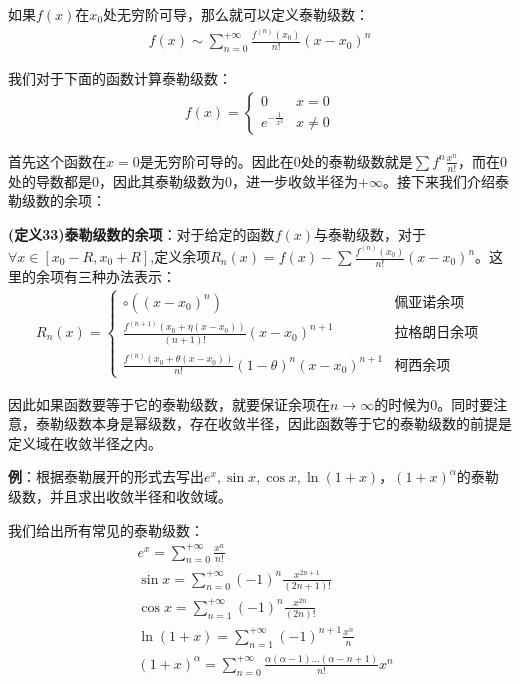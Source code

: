 \documentclass{ctexart}
\let\oldtextbf\textbf
\renewcommand{\textbf}[1]{\textcolor{brown!50!red}{\oldtextbf{#1}}}
\begin{document}
如果$f(x)$在$x_0$处无穷阶可导，那么就可以定义泰勒级数：
\begin{align*}
    f(x)\sim\sum_{n=0}^{+\infty}\frac{f^{(n)}(x_0)}{n!}(x-x_0)^n
\end{align*}

我们对于下面的函数计算泰勒级数：
\begin{align*}
    f(x)=\begin{cases}
        0&x=0\\
        e^{-\frac{1}{x^2}}& x\neq 0
    \end{cases}
\end{align*}

首先这个函数在$x=0$是无穷阶可导的。因此在0处的泰勒级数就是$\sum f^n\frac{x^n}{n!}$，而在0处的导数都是0，因此其泰勒级数为0，进一步收敛半径为$+\infty$。接下来我们介绍泰勒级数的余项：
\begin{tcolorbox}[
    colback=bac2,     %
    colframe=fra2,   %
    coltitle=white,             %
    coltext=tex2,
    title=泰勒级数的余项,
    fonttitle=\bfseries,        %
arc=3mm,                     %
breakable
]
\textbf{\color{brown!50!red}(定义33)泰勒级数的余项}：对于给定的函数$f(x)$与泰勒级数，对于$\forall x\in[x_0-R,x_0+R]$,定义余项$R_n(x)=f(x)-\sum \frac{f^{(n)}(x_0)}{n!}(x-x_0)^n$。这里的余项有三种办法表示：
\begin{align*}
   R_n(x)=\begin{cases}
\circ((x-x_0)^n) &\text{佩亚诺余项}\\
\frac{f^{(n+1)}(x_0+\eta(x-x_0))}{(n+1)!}(x-x_0)^{n+1}&\text{拉格朗日余项}\\
\frac{f^{(n)}(x_0+\theta(x-x_0))}{n!}(1-\theta)^n(x-x_0)^{n+1}&\text{柯西余项}  
\end{cases} 
\end{align*}
\end{tcolorbox}

因此如果函数要等于它的泰勒级数，就要保证余项在$n\to\infty$的时候为0。同时要注意，泰勒级数本身是幂级数，存在收敛半径，因此函数等于它的泰勒级数的前提是定义域在收敛半径之内。

\textbf{\color{brown!50!red}例}：根据泰勒展开的形式去写出$e^x,\sin x,\cos x,\ln(1+x)，(1+x)^\alpha$的泰勒级数，并且求出收敛半径和收敛域。
\begin{tcolorbox}[
    colback=bac1,     %
    colframe=fra1,   %
    coltitle=white!80,    
    coltext=tex1,%
    title=常见泰勒级数,
    fonttitle=\bfseries,        %
arc=2mm,                     %
breakable
]
我们给出所有常见的泰勒级数：
\begin{align*}
  &e^x=\sum_{n=0}^{+\infty}\frac{x^n}{n!}\tag{5-2}\\
&\sin x=\sum_{n=0}^{+\infty}(-1)^n\frac{x^{2n+1}}{(2n+1)!}\tag{5-3}\\
&\cos x=\sum_{n=1}^{+\infty}(-1)^n\frac{x^{2n}}{(2n)!}\tag{5-4}\\
&\ln(1+x)=\sum_{n=1}^{+\infty}(-1)^{n+1}\frac{x^n}{n}\tag{5-5}\\
&(1+x)^\alpha=\sum_{n=0}^{+\infty}\frac{\alpha(\alpha-1)...(\alpha-n+1)}{n!}x^n \tag{5-6}     
\end{align*}
\end{tcolorbox}
\end{document}
